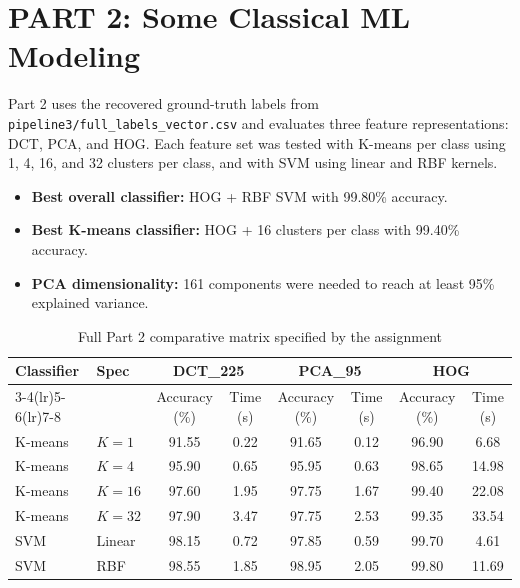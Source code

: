 \documentclass[12pt,a4paper]{article}
\begin{document}
\renewcommand{\thesubsection}{\thesection.\arabic{subsection}}
\renewcommand{\thesubsubsection}{\thesubsection.\arabic{subsubsection}}

\section*{PART 2: Some Classical ML Modeling}

Part 2 uses the recovered ground-truth labels from \texttt{pipeline3/full\_labels\_vector.csv} and evaluates three feature representations: DCT, PCA, and HOG. Each feature set was tested with K-means per class using 1, 4, 16, and 32 clusters per class, and with SVM using linear and RBF kernels.

\begin{itemize}
    \item \textbf{Best overall classifier:} HOG + RBF SVM with 99.80\% accuracy.
    \item \textbf{Best K-means classifier:} HOG + 16 clusters per class with 99.40\% accuracy.
    \item \textbf{PCA dimensionality:} 161 components were needed to reach at least 95\% explained variance.
\end{itemize}

\begin{table}[H]
\centering
\small
\setlength{\tabcolsep}{5pt}
\renewcommand{\arraystretch}{1.12}
\begin{tabular}{llcccccc}
\toprule
Classifier & Spec & \multicolumn{2}{c}{DCT\_225} & \multicolumn{2}{c}{PCA\_95} & \multicolumn{2}{c}{HOG} \\
\cmidrule(lr){3-4}\cmidrule(lr){5-6}\cmidrule(lr){7-8}
 &  & Accuracy (\%) & Time (s) & Accuracy (\%) & Time (s) & Accuracy (\%) & Time (s) \\
\midrule
K-means & $K=1$  & 91.55 & 0.22 & 91.65 & 0.12 & 96.90 & 6.68 \\
K-means & $K=4$  & 95.90 & 0.65 & 95.95 & 0.63 & 98.65 & 14.98 \\
K-means & $K=16$ & 97.60 & 1.95 & 97.75 & 1.67 & 99.40 & 22.08 \\
K-means & $K=32$ & 97.90 & 3.47 & 97.75 & 2.53 & 99.35 & 33.54 \\
SVM & Linear & 98.15 & 0.72 & 97.85 & 0.59 & 99.70 & 4.61 \\
SVM & RBF & 98.55 & 1.85 & 98.95 & 2.05 & 99.80 & 11.69 \\
\bottomrule
\end{tabular}
\caption{Full Part 2 comparative matrix specified by the assignment}
\end{table}
\end{document}
